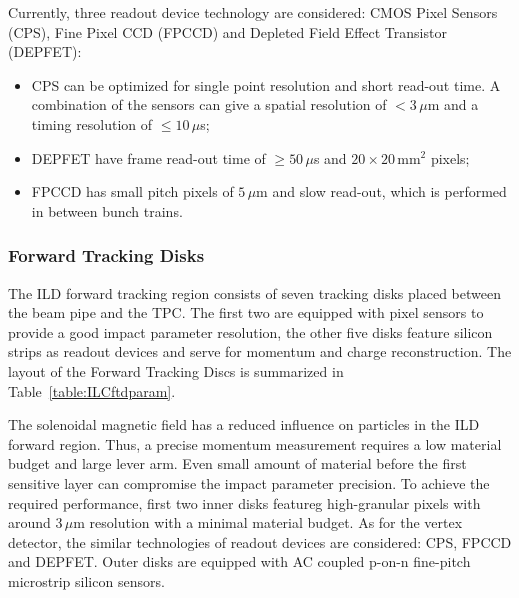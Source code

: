 Currently, three readout device technology are considered: CMOS Pixel Sensors (CPS), Fine Pixel CCD (FPCCD) and Depleted Field Effect Transistor (DEPFET):
\begin{itemize}
	\item CPS can be optimized  for single point resolution and short read-out time. A combination of the sensors can give a spatial resolution of $< 3\,\mu$m and a timing
	resolution of $\leq10\,\mu$s;
	\item DEPFET have frame read-out time of $\geq 50\,\mu$s and $20 \times 20\,$mm$^2$ pixels;
	\item FPCCD has small pitch pixels of $5\,\mu$m and slow read-out, which is performed in between bunch trains.
\end{itemize}




\subsubsection{Forward Tracking Disks}

The ILD forward tracking region consists of seven tracking disks placed between the beam pipe and the TPC. The first two are equipped with pixel sensors to provide a good impact parameter resolution, the other five disks feature silicon strips as readout devices and serve for momentum and charge reconstruction. The layout of the Forward Tracking Discs is summarized in Table~\ref{table:ILCftdparam}. 



The solenoidal magnetic field has a reduced influence on particles in the ILD forward region.
Thus, a precise momentum measurement requires a low material budget and large lever arm. Even small amount of material before the first sensitive layer can compromise the impact parameter precision. To achieve the required performance, first two inner disks featureg high-granular pixels with around 3\,$\mu$m resolution with a minimal material budget. As for the vertex detector, the similar technologies of readout devices are considered: CPS, FPCCD and DEPFET. Outer disks are equipped with AC coupled p-on-n fine-pitch microstrip silicon sensors.

